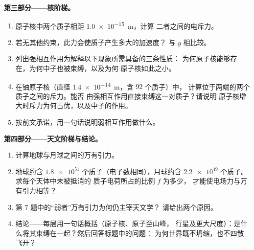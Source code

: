 \begin{problem}
\medskip
\noindent\textbf{第三部分——核阶梯。}
\begin{enumerate}[resume]
  \item 原子核中两个质子相距 \qty{1.0e-15}{m}，计算
        二者之间的电斥力。
  \item 若无其他约束，此力会使质子产生多大的加速度？
        与 $g$ 相比较。
  \item 列出强相互作用为解释以下现象所需具备的三条性质：
        为何原子核能够存在，为何中子也被束缚，以及为何
        原子核如此之小。
  \item 在铀原子核（直径 \qty{1.4e-14}{m}，含 $92$ 个质子）中，
        计算位于两端的两个质子之间的斥力。能否
        由强相互作用直接束缚这一对质子？请说明
        原子核增大时斥力为何占优，以及中子的作用。
  \item 按前文承诺，用一句话说明弱相互作用做什么。
\end{enumerate}

\medskip
\noindent\textbf{第四部分——天文阶梯与结论。}
\begin{enumerate}[resume]
  \item 计算地球与月球之间的万有引力。
  \item 地球约含 $\num{1.8e51}$ 个质子（电子数相同），月球约含
        $\num{2.2e49}$ 个质子。求每个天体中未被抵消的
        质子电荷所占的比例 $f$ 为多少，
        才能使电场力与万有引力相等？
  \item 第 7 题中的“弱者”万有引力为何仍主宰天文学？
        请给出两个原因。
  \item 结论——每层用一句话概括（原子核、原子至山峰，
        行星及更大尺度）：是什么将其束缚在一起？然后回答标题中的问题：
        为何世界既不坍缩，也不四散飞开？
\end{enumerate}
\end{problem}
